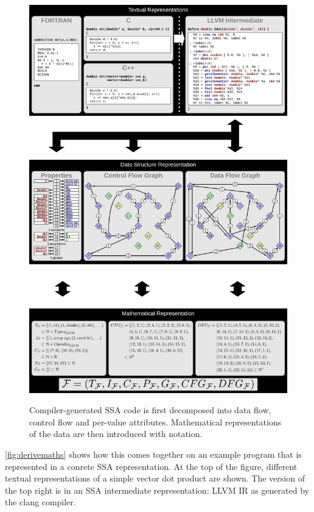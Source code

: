 \begin{figure}[p]
\centering
\includegraphics[width=\textwidth,height=1.5\textwidth]{figures/ssamathmodel.pdf}\\[9.3319pt]
\caption{Compiler-generated SSA code is first decomposed into data flow, control
         flow and per-value attributes.
         Mathematical representations of the data are then introduced with
         notation.}
\label{fig:derivemaths}
\end{figure}

    \autoref{fig:derivemaths} shows how this comes together on an example
    program that is represented in a conrete SSA representation.
    At the top of the figure, different textual representations of a simple
    vector dot product are shown.
    The version of the top right is in an SSA intermediate representation: LLVM
    IR as generated by the clang compiler.


